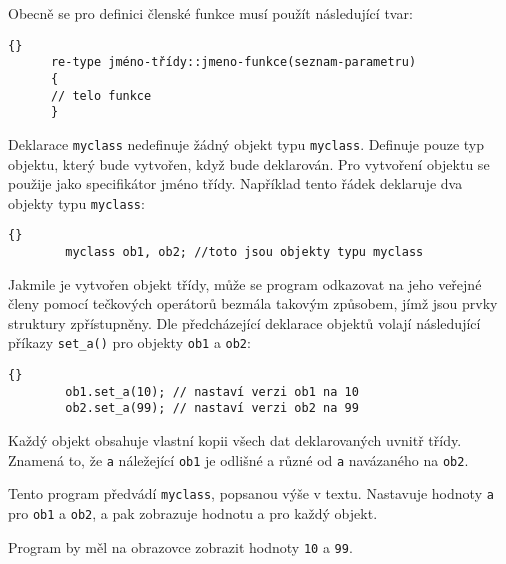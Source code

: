 {      Obecně se pro definici členské funkce musí použít následující tvar:
      \begin{lstlisting}{}
      re-type jméno-třídy::jmeno-funkce(seznam-parametru)
      {
      // telo funkce
      }
      \end{lstlisting}
      Deklarace \lstinline[basicstyle=\ttfamily]!myclass! nedefinuje žádný objekt typu 
      \lstinline[basicstyle=\ttfamily]!myclass!. Definuje pouze typ objektu, který bude vytvořen, 
      když bude deklarován. Pro vytvoření objektu se použije jako specifikátor jméno třídy. 
      Například tento řádek deklaruje dva objekty typu \lstinline[basicstyle=\ttfamily]!myclass!:
      \begin{lstlisting}{}
        myclass ob1, ob2; //toto jsou objekty typu myclass
      \end{lstlisting}
      Jakmile je vytvořen objekt třídy, může se program odkazovat na jeho veřejné členy pomocí 
      tečkových operátorů bezmála takovým způsobem, jímž jsou prvky struktury zpřístupněny. Dle 
      předcházející deklarace objektů volají následující příkazy 
      \lstinline[basicstyle=\ttfamily]!set_a()! pro objekty 
      \lstinline[basicstyle=\ttfamily]!ob1! a \lstinline[basicstyle=\ttfamily]!ob2!:
      \begin{lstlisting}{}
        ob1.set_a(10); // nastaví verzi ob1 na 10
        ob2.set_a(99); // nastaví verzi ob2 na 99
      \end{lstlisting}
      Každý objekt obsahuje vlastní kopii všech dat deklarovaných uvnitř třídy. Znamená to, že 
      \lstinline[basicstyle=\ttfamily]!a! náležející \lstinline[basicstyle=\ttfamily]!ob1! je 
      odlišné a různé od \lstinline[basicstyle=\ttfamily]!a! navázaného na 
      \lstinline[basicstyle=\ttfamily]!ob2!.
  
      \begin{example}
         Tento program předvádí \lstinline[basicstyle=\ttfamily]!myclass!, popsanou výše v textu. 
         Nastavuje hodnoty \lstinline[basicstyle=\ttfamily]!a! pro 
         \lstinline[basicstyle=\ttfamily]!ob1! a 
         \lstinline[basicstyle=\ttfamily]!ob2!, a pak zobrazuje hodnotu a pro každý objekt.
         
         Program by měl na obrazovce zobrazit hodnoty \lstinline[basicstyle=\ttfamily]!10! a 
         \lstinline[basicstyle=\ttfamily]!99!.
      \end{example}
  
}
